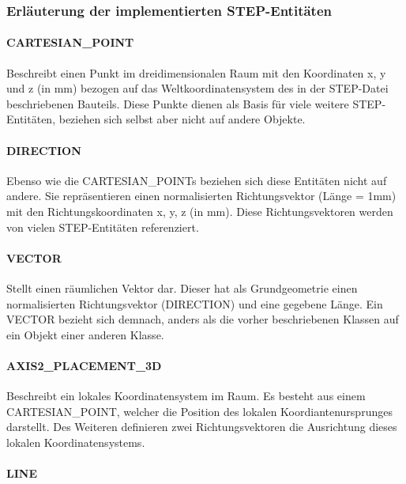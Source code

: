 \subsubsection{Erläuterung der implementierten STEP-Entitäten}

\paragraph{CARTESIAN\_POINT}

Beschreibt einen Punkt im dreidimensionalen Raum mit den Koordinaten x, y und z (in mm) bezogen auf das Weltkoordinatensystem des in der STEP-Datei beschriebenen Bauteils. Diese Punkte dienen als Basis für viele weitere STEP-Entitäten, beziehen sich selbst aber nicht auf andere Objekte. 

\paragraph{DIRECTION}

Ebenso wie die CARTESIAN\_POINTs beziehen sich diese Entitäten nicht auf andere. Sie repräsentieren einen normalisierten Richtungsvektor (Länge = 1mm) mit den Richtungskoordinaten x, y, z (in mm). Diese Richtungsvektoren werden von vielen STEP-Entitäten referenziert.

\paragraph{VECTOR}

Stellt einen räumlichen Vektor dar. Dieser hat als Grundgeometrie einen normalisierten Richtungsvektor (DIRECTION) und eine gegebene Länge. Ein VECTOR bezieht sich demnach, anders als die vorher beschriebenen Klassen auf ein Objekt einer anderen Klasse.

\paragraph{AXIS2\_PLACEMENT\_3D}

Beschreibt ein lokales Koordinatensystem im Raum. Es besteht aus einem CARTESIAN\_POINT, welcher die Position des lokalen Koordiantenursprunges darstellt. Des Weiteren definieren zwei Richtungsvektoren die Ausrichtung dieses lokalen Koordinatensystems.

\paragraph{LINE}

